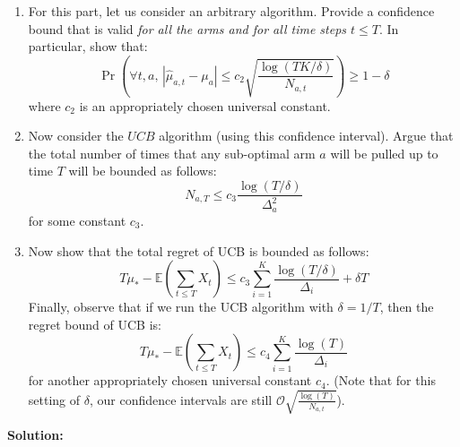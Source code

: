 \documentclass{article}
\newcommand{\solution}{\textbf{\vskip 0.2cm \large Solution:\\}}
\newcommand{\E}[1]{\mathbb{E}\left(#1\right)}
\begin{document}
\begin{enumerate}
	\item For this part, let us consider an arbitrary algorithm. Provide a confidence bound that is valid \emph{for all the arms and for all time steps $t\leq T$}. In particular, show that:
	\[
		\Pr\left( \forall t,a, \, | \hat \mu_{a,t} - \mu_a | \leq c_2 \sqrt{\frac{\log(TK/\delta)}{N_{a,t}}} \right)\geq 1-\delta
	\]
	where $c_2$ is an appropriately chosen universal constant.

	\item  Now consider the $UCB$ algorithm (using this confidence interval). Argue that the total number of times that any sub-optimal arm $a$ will be pulled up to time $T$ will be bounded as follows:
	\[
		N_{a,T} \leq c_3 \frac{\log(T/\delta)}{\Delta_a^2} 
	\]
	for some constant $c_3$.

	\item Now show that the total regret of UCB is bounded as follows: 
	\[
		T \mu_* - \E{\sum_{t\leq T} X_t}   \leq c_3 \sum_{i=1}^K\frac{\log(T/\delta)}{\Delta_i} + \delta T
	\]
	Finally, observe that if we run the UCB algorithm with $\delta=1/T$, then the regret bound of UCB is:
	\[
		T \mu_* - \E{\sum_{t\leq T} X_t}   \leq c_4 \sum_{i=1}^K\frac{\log(T)}{\Delta_i}
	\]
	for another appropriately chosen universal constant $c_4$. (Note that for this setting of $\delta$, our confidence intervals are still $\mathcal{O} \sqrt{\frac{\log(T)}{N_{a,t}}}$).
\end{enumerate}

\solution
\end{document}
